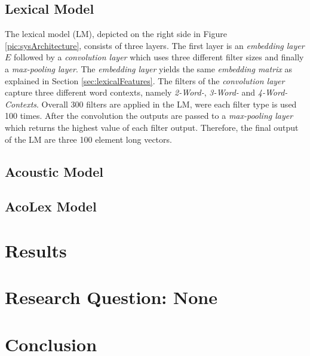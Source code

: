 \documentclass[11pt,a4paper]{article}
\begin{document}
\subsection{Lexical Model}
The lexical model (LM), depicted on the right side in Figure \ref{pic:sysArchitecture}, consists of three layers. The first layer is an \textit{embedding layer} $E$ followed by a \textit{convolution layer} which uses three different filter sizes and finally a \textit{max-pooling layer}. The \textit{embedding layer} yields the same \textit{embedding matrix} as explained in Section \ref{sec:lexicalFeatures}. The filters of the \textit{convolution layer} capture three different word contexts, namely \textit{2-Word-}, \textit{3-Word-} and \textit{4-Word-Contexts}. Overall 300 filters are applied in the LM, were each filter type is used 100 times. After the convolution the outputs are passed to a \textit{max-pooling layer} which returns the highest value of each filter output. Therefore, the final output of the LM are three 100 element long vectors.

\subsection{Acoustic Model}

\subsection{AcoLex Model}

\section{Results}

\section{Research Question: None}

\section{Conclusion}



\nocite{*}
\end{document}
